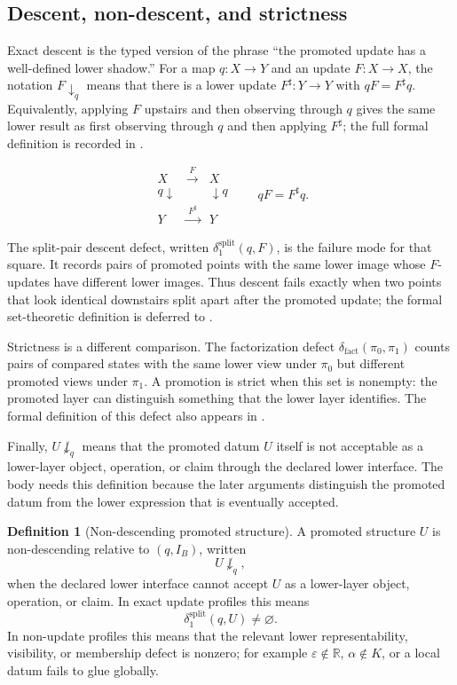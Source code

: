 \documentclass[11pt]{article}
\theoremstyle{definition}
\newtheorem{definition}[theorem]{Definition}
\begin{document}
\subsection{Descent, non-descent, and strictness}
\label{subsec:layers-descent-nondescent-strictness}

Exact descent is the typed version of the phrase ``the promoted update has a
well-defined lower shadow.''  For a map \(q:X\to Y\) and an update \(F:X\to X\),
the notation \(F\downarrow_q\) means that there is a lower update
\(F^\sharp:Y\to Y\) with \(qF=F^\sharp q\).  Equivalently, applying \(F\)
upstairs and then observing through \(q\) gives the same lower result as first
observing through \(q\) and then applying \(F^\sharp\); the full formal
definition is recorded in .

\[
\begin{array}{ccc}
X & \xrightarrow{\;F\;} & X\\[-1mm]
{\scriptstyle q}\!\downarrow & & \downarrow\!{\scriptstyle q}\\[-1mm]
Y & \xrightarrow{\;F^\sharp\;} & Y
\end{array}
\qquad
qF=F^\sharp q.
\]

The split-pair descent defect, written
\(\delta^{\mathrm{split}}_1(q,F)\), is the failure mode for that square.  It
records pairs of promoted points with the same lower image whose \(F\)-updates
have different lower images.  Thus descent fails exactly when two points that
look identical downstairs split apart after the promoted update; the formal
set-theoretic definition is deferred to .

Strictness is a different comparison.  The factorization defect
\(\delta_{\mathrm{fact}}(\pi_0,\pi_1)\) counts pairs of compared states with
the same lower view under \(\pi_0\) but different promoted views under
\(\pi_1\).  A promotion is strict when this set is nonempty: the promoted layer
can distinguish something that the lower layer identifies.  The formal
definition of this defect also appears in .

Finally, \(U\not\downarrow_q\) means that the promoted datum \(U\) itself is
not acceptable as a lower-layer object, operation, or claim through the
declared lower interface.  The body needs this definition because the later
arguments distinguish the promoted datum from the lower expression that is
eventually accepted.

\begin{definition}[Non-descending promoted structure]
\label{def:sau-nondescending-structure}
A promoted structure \(U\) is non-descending relative to \((q,I_B)\), written
\[
U\not\downarrow_q,
\]
when the declared lower interface cannot accept \(U\) as a lower-layer object, operation, or claim. In exact update profiles this means
\[
\delta^{\mathrm{split}}_1(q,U)\neq\varnothing.
\]
In non-update profiles this means that the relevant lower representability, visibility, or membership defect is nonzero; for example \(\varepsilon\notin\mathbb R\), \(\alpha\notin K\), or a local datum fails to glue globally.
\end{definition}
\end{document}
